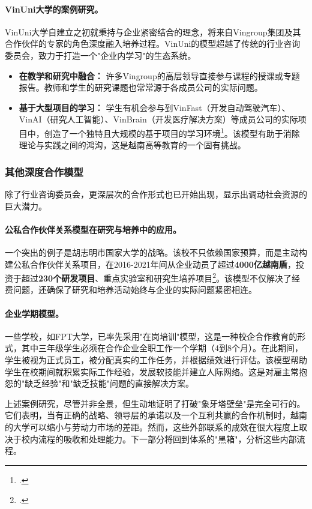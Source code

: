 \paragraph{VinUni大学的案例研究。} VinUni大学自建立之初就秉持与企业紧密结合的理念，将来自Vingroup集团及其合作伙伴的专家的角色深度融入培养过程。VinUni的模型超越了传统的行业咨询委员会，致力于打造一个"企业内学习"的生态系统。
\begin{itemize}
    \item \textbf{在教学和研究中融合：} 许多Vingroup的高层领导直接参与课程的授课或专题报告。教师和学生的研究课题也常常源于各成员公司的实际问题。
    \item \textbf{基于大型项目的学习：} 学生有机会参与到VinFast（开发自动驾驶汽车）、VinAI（研究人工智能）、VinBrain（开发医疗解决方案）等成员公司的实际项目中，创造了一个独特且大规模的基于项目的学习环境\footcite{vinuni_industry_collaboration_2023}。该模型有助于消除理论与实践之间的鸿沟，这是越南高等教育的一个固有挑战。
\end{itemize}

\subsubsection{其他深度合作模型}
除了行业咨询委员会，更深层次的合作形式也已开始出现，显示出调动社会资源的巨大潜力。

\paragraph{公私合作伙伴关系模型在研究与培养中的应用。} 一个突出的例子是胡志明市国家大学的战略。该校不只依赖国家预算，而是主动构建公私合作伙伴关系项目，在2016-2021年间从企业动员了超过\textbf{4000亿越南盾}，投资于超过\textbf{230个研发项目}、重点实验室和研究生培养项目\footcite{vnuhcm_ppp_2022}。该模型不仅解决了经费问题，还确保了研究和培养活动始终与企业的实际问题紧密相连。

\paragraph{企业学期模型。} 一些学校，如FPT大学，已率先采用"在岗培训"模型，这是一种校企合作教育的形式，其中三年级学生必须在合作企业全职工作一个学期（4到8个月）。在此期间，学生被视为正式员工，被分配真实的工作任务，并根据绩效进行评估。该模型帮助学生在校期间就积累实际工作经验，发展软技能并建立人际网络。这是对雇主常抱怨的"缺乏经验"和"缺乏技能"问题的直接解决方案。

\bigskip
上述案例研究，尽管并非全景，但生动地证明了打破"象牙塔壁垒"是完全可行的。它们表明，当有正确的战略、领导层的承诺以及一个互利共赢的合作机制时，越南的大学可以缩小与劳动力市场的差距。然而，这些外部联系的成效在很大程度上取决于校内流程的吸收和处理能力。下一部分将回到体系的"黑箱"，分析这些内部流程。



